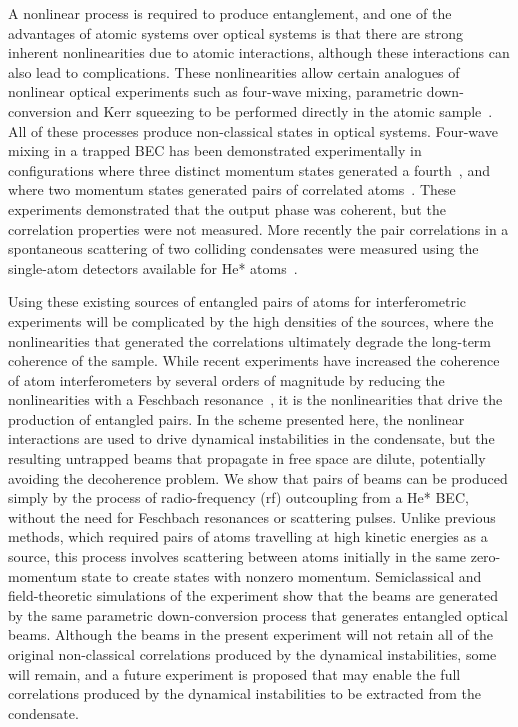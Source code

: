 A nonlinear process is required to produce entanglement, and one of the advantages of atomic systems over optical systems is that there are strong inherent nonlinearities due to atomic interactions, although these interactions can also lead to complications. These nonlinearities allow certain analogues of nonlinear optical experiments such as four-wave mixing, parametric down-conversion and Kerr squeezing to be performed directly in the atomic sample~\citep{WallsMilburn}. All of these processes produce non-classical states in optical systems. Four-wave mixing in a trapped BEC has been demonstrated experimentally in configurations where three distinct momentum states generated a fourth~\citep{Deng:1999qy}, and where two momentum states generated pairs of correlated atoms~\citep{Vogels:2002}. These experiments demonstrated that the output phase was coherent, but the correlation properties were not measured. More recently the pair correlations in a spontaneous scattering of two colliding condensates were measured using the single-atom detectors available for He* atoms~\citep{Perrin:2007}.

Using these existing sources of entangled pairs of atoms for interferometric experiments will be complicated by the high densities of the sources, where the nonlinearities that generated the correlations ultimately degrade the long-term coherence of the sample. While recent experiments have increased the coherence of atom interferometers by several orders of magnitude by reducing the nonlinearities with a Feschbach resonance~\citep{Fattori:2008,Gustavsson:2008}, it is the nonlinearities that drive the production of entangled pairs.  In the scheme presented here, the nonlinear interactions are used to drive dynamical instabilities in the condensate, but the resulting untrapped beams that propagate in free space are dilute, potentially avoiding the decoherence problem.  We show that pairs of beams can be produced simply by the process of radio-frequency (rf) outcoupling from a He* BEC, without the need for Feschbach resonances or scattering pulses.  Unlike previous methods, which required pairs of atoms travelling at high kinetic energies as a source, this process involves scattering between atoms initially in the same zero-momentum state to create states with nonzero momentum.  Semiclassical and field-theoretic simulations of the experiment show that the beams are generated by the same parametric down-conversion process that generates entangled optical beams.  Although the beams in the present experiment will not retain all of the original non-classical correlations produced by the dynamical instabilities, some will remain, and a future experiment is proposed that may enable the full correlations produced by the dynamical instabilities to be extracted from the condensate.

